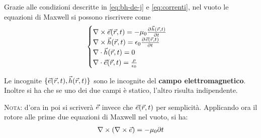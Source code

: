 Grazie alle condizioni descritte in \eqref{eq:bh-de-j} e \eqref{eq:correnti}, nel vuoto
le equazioni di Maxwell si possono riscrivere come
\begin{equation}\begin{cases}
  \nabla\times \vec{e}(\vec{r},t) = -\mu_0 \frac{\partial^{} {\vec{h}(\vec{r},t)}}{\partial {t}^{}} \\
  \nabla\times \vec{h}(\vec{r},t) = \epsilon_0 \frac{\partial^{} {\vec{e}(\vec{r},t)}}{\partial {t}^{}}\\
  \nabla\cdot \vec{h}(\vec{r},t) = 0 \\ \nabla\cdot\vec{e}(\vec{r},t) = \frac{\rho}{\epsilon_0}
\end{cases}\label{eq:maxwell-vuoto}\end{equation}

Le incognite $\{\vec{e}(\vec{r},t), \vec{h}(\vec{r},t)\}$ sono le incognite del \textbf{campo elettromagnetico}.
Inoltre si ha che se uno dei due campi è statico, l'altro risulta indipendente.

\textsc{Nota:} d'ora in poi si scriverà $\vec{e}$ invece che $\vec{e}(\vec{r},t)$ per semplicità.
Applicando ora il rotore alle prime due equazioni di Maxwell nel vuoto, si ha:
\begin{equation}\begin{split}
  \nabla\times\left(\nabla\times\vec{e}\right) = -\mu_0 \partial{}{t}
\end{split}\end{equation}
